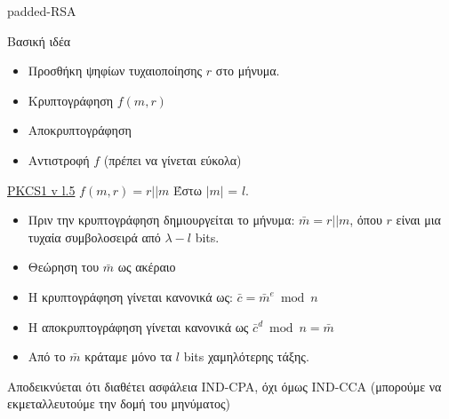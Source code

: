 \documentclass[handout]{beamer}
\begin{document}
\begin{frame}[allowframebreaks]{padded-RSA}

\begin{block}{Βασική ιδέα}
\begin{itemize}
    \item Προσθήκη ψηφίων τυχαιοποίησης $r$ στο μήνυμα. 
    \item Κρυπτογράφηση $f(m,r)$
    \item Αποκρυπτογράφηση
    \item Αντιστροφή $f$ (πρέπει να γίνεται εύκολα)
\end{itemize}
\end{block}

\begin{block}{\href{https://tools.ietf.org/html/rfc2313}{PKCS1 v l.5} $f(m,r) = r||m$}
 Έστω $|m|$ = $l$.
\begin{itemize}
\item Πριν την κρυπτογράφηση δημιουργείται το μήνυμα: $\bar{m} = r || m$, όπου $r$ είναι μια τυχαία συμβολοσειρά από $\lambda-l$ bits.
\item Θεώρηση του $\bar{m}$ ως ακέραιο
\item Η κρυπτογράφηση γίνεται κανονικά ως: $\bar{c} = \bar{m}^e \bmod n$
\item H αποκρυπτογράφηση γίνεται κανονικά ως $\bar{c}^d \bmod n = \bar{m} $
\item Από το $\bar{m}$ κράταμε μόνο τα $l$ bits χαμηλότερης τάξης.
\end{itemize}
\end{block}

Αποδεικνύεται ότι διαθέτει ασφάλεια IND-CPA, όχι όμως IND-CCA (μπορούμε να εκμεταλλευτούμε την δομή του μηνύματος)
\end{frame}
\end{document}
